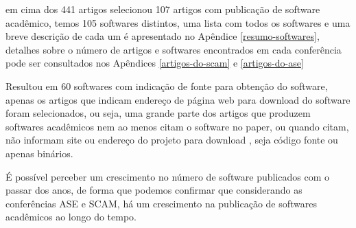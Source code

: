 

em cima dos 441 artigos selecionou 107 artigos com publicação de software
acadêmico, temos 105 softwares distintos, uma lista com todos os softwares e
uma breve descrição de cada um é apresentado no Apêndice
\ref{resumo-softwares}, detalhes sobre o número de artigos e softwares
encontrados em cada conferência pode ser consultados nos Apêndices
\ref{artigos-do-scam} e \ref{artigos-do-ase} 


Resultou em 60 softwares com indicação de fonte para obtenção do
software, apenas os artigos que indicam endereço de página web para download do
software foram selecionados, ou seja, uma grande parte dos artigos que produzem
softwares acadêmicos nem ao menos citam o software no paper, ou quando citam,
não informam site ou endereço do projeto para download
\cite{allen2017engineering}, seja código fonte ou apenas binários.

É possível perceber um crescimento no número de software publicados com o
passar dos anos, de forma que podemos confirmar que considerando as
conferências ASE e SCAM, há um crescimento na publicação de softwares
acadêmicos ao longo do tempo.


